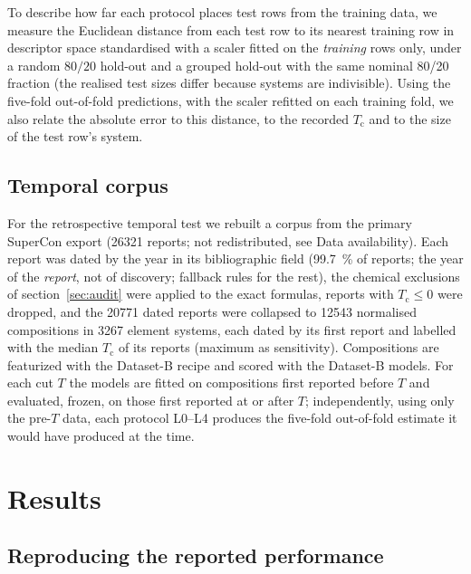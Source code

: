 \documentclass{iopjournal}
\newcommand{\Tc}{T_{\mathrm c}}
\begin{document}
To describe how far each protocol places test rows from the training data, we measure the Euclidean
distance from each test row to its nearest training row in descriptor space standardised with a
scaler fitted on the \emph{training} rows only, under a random $80/20$ hold-out and a grouped hold-out with the same nominal 80/20 fraction (the realised test sizes differ because systems are indivisible). Using the five-fold out-of-fold predictions, with the scaler refitted on each training fold, we also relate the absolute error to this distance, to the recorded $\Tc$ and to the size of the test row's system.

\subsection{Temporal corpus}
\label{sec:temporal-data}

For the retrospective temporal test we rebuilt a corpus from the primary SuperCon export (\num{26321}
reports; not redistributed, see Data availability). Each report was dated by the year in its
bibliographic field (\SI{99.7}{\percent} of reports; the year of the \emph{report}, not of
discovery; fallback rules for the rest), the chemical exclusions of section~\ref{sec:audit} were
applied to the exact formulas, reports with $\Tc \le 0$ were dropped, and the \num{20771} dated
reports were collapsed to \num{12543} normalised compositions in \num{3267} element systems, each
dated by its first report and labelled with the median $\Tc$ of its reports (maximum as
sensitivity). Compositions are featurized with the Dataset-B recipe and scored with the Dataset-B
models. For each cut $T$ the models are fitted on compositions first reported before $T$ and
evaluated, frozen, on those first reported at or after $T$; independently, using only the pre-$T$
data, each protocol L0--L4 produces the five-fold out-of-fold estimate it would have produced at
the time.

\section{Results}

\subsection{Reproducing the reported performance}
\label{sec:results-repro}
\end{document}
